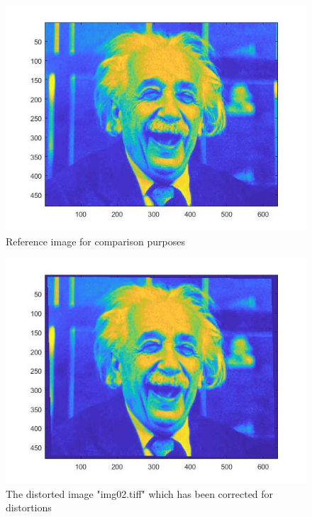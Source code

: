 \documentclass[12pt,oneside,openany,a4paper, %
english, %
masters-t, goldenblock]{usthesis}
\begin{document}
\begin{figure}[H]
    \centering
    \includegraphics[scale=0.6]{reference_image2.jpg}
    \caption{Reference image for comparison purposes}
    \label{fig:reference2}
\end{figure}

\begin{figure}[H]
    \centering
    \includegraphics[scale=0.6]{partB.jpg}
    \caption{The distorted image "img02.tiff" which has been corrected for distortions}
    \label{fig:undist2}
\end{figure}
\end{document}
